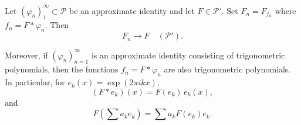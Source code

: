 Let $(\varphi_n)_{1}^{\infty} \subset \mathcal{P}$ be an approximate identity and let $F \in \mathcal{P}'$. Set $F_n = F_{f_n}$ where $f_n = F * \varphi_n$. Then
$$F_n \to F \quad (\mathcal{P}').$$

Moreover, if $(\varphi_n)_{n=1}^{\infty}$ is an approximate identity consisting of trigonometric polynomials, then the functions $f_n = F * \varphi_n$ are also trigonometric polynomials. In particular, for $e_k(x) = \exp(2\pi i k x)$,
$$(F * e_k)(x) = F(e_k) \, e_k(x),$$
and
$$F\left(\sum a_k e_k\right) = \sum a_k F(e_k) e_k.$$
